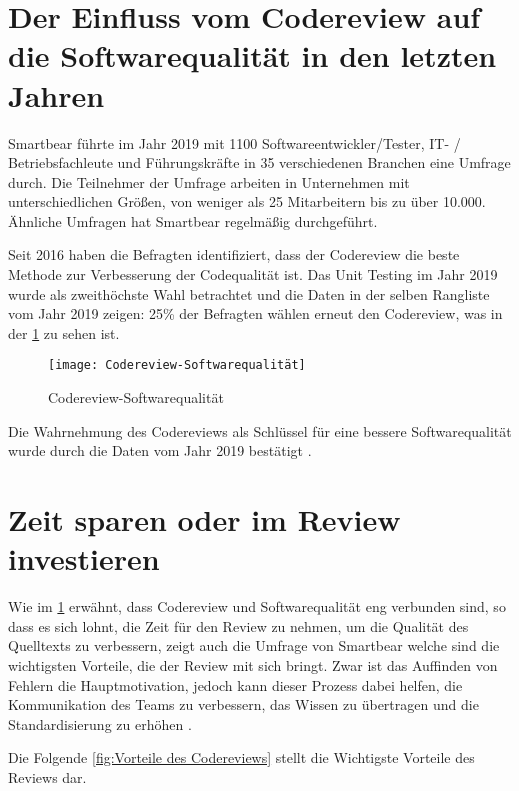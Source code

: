 \section{Der Einfluss vom Codereview auf die Softwarequalität in den letzten Jahren}
\label{sec:Einfluss des Reviews}
Smartbear \cite{smartbear} führte im Jahr 2019 mit 1100 Softwareentwickler/Tester, IT- / Betriebsfachleute und Führungskräfte in 35 verschiedenen Branchen eine Umfrage durch. Die Teilnehmer der Umfrage arbeiten in Unternehmen mit unterschiedlichen Größen, von weniger als 25 Mitarbeitern bis zu über 10.000. Ähnliche Umfragen hat Smartbear regelmäßig durchgeführt.

Seit 2016 haben die Befragten identifiziert, dass der Codereview die beste Methode zur Verbesserung der Codequalität ist. Das Unit Testing im Jahr 2019 wurde als zweithöchste Wahl betrachtet und die Daten in der selben Rangliste vom Jahr 2019 zeigen: 25\% der Befragten wählen erneut den Codereview, was in der \cref{fig:Codereview-Softwarequalität} zu sehen ist.

\begin{figure}[H]
	\centering
	\texttt{[image: Codereview-Softwarequalität]}
	\caption[Einfluss der Codereview auf die Softwarequalität]{Codereview-Softwarequalität\\ \cite{smartbear}}
	\label{fig:Codereview-Softwarequalität}
\end{figure}

Die Wahrnehmung des Codereviews als Schlüssel für eine bessere Softwarequalität wurde durch die Daten vom Jahr 2019 bestätigt \cite{smartbear}.


\section{Zeit sparen oder im Review investieren}
\label{sec:reviewZeit}

Wie im \cref{sec:Einfluss des Reviews} erwähnt, dass Codereview und Softwarequalität eng verbunden sind, so dass es sich lohnt, die Zeit für den Review zu nehmen, um die Qualität des Quelltexts zu verbessern, zeigt auch die Umfrage von Smartbear welche sind die wichtigsten Vorteile, die der Review mit sich bringt. Zwar ist das Auffinden von Fehlern die Hauptmotivation, jedoch kann dieser Prozess dabei helfen, die Kommunikation des Teams zu verbessern, das Wissen zu übertragen und die Standardisierung zu erhöhen \cite{smartbear}. 

Die Folgende \cref{fig:Vorteile des Codereviews} stellt die Wichtigste Vorteile des Reviews dar.

